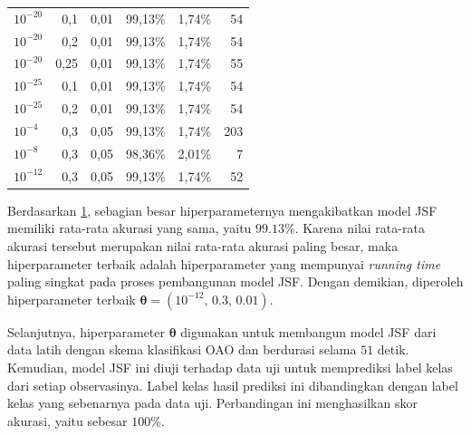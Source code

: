 \begin{table}[h!]
\begin{tabular}{lrrrrr}
    $10^{-20}$ & 0,1   & 0,01  & 99,13\% & 1,74\% & 54 \\
    $10^{-20}$ & 0,2   & 0,01  & 99,13\% & 1,74\% & 54 \\
    $10^{-20}$ & 0,25  & 0,01  & 99,13\% & 1,74\% & 55 \\
    $10^{-25}$ & 0,1   & 0,01  & 99,13\% & 1,74\% & 54 \\
    $10^{-25}$ & 0,2   & 0,01  & 99,13\% & 1,74\% & 54 \\
    $10^{-4}$ & 0,3   & 0,05  & 99,13\% & 1,74\% & 203 \\
    $10^{-8}$ & 0,3   & 0,05  & 98,36\% & 2,01\% & 7 \\
    $10^{-12}$ & 0,3   & 0,05  & 99,13\% & 1,74\% & 52 \\
    \bottomrule
    \end{tabular}%
  \label{tab: iris OAO}%
\end{table}%

\noindent Berdasarkan \ref{tab: iris OAO}, sebagian besar hiperparameternya mengakibatkan model JSF memiliki rata-rata akurasi yang sama, yaitu $\num{99,13}\%$. Karena nilai rata-rata akurasi tersebut merupakan nilai rata-rata akurasi paling besar, maka hiperparameter terbaik adalah hiperparameter yang mempunyai \emph{running time} paling singkat pada proses pembangunan model JSF. Dengan demikian, diperoleh hiperparameter terbaik $\boldsymbol{\theta} = (10^{-12} \text{, } \allowbreak \num{0,3} \text{, } \allowbreak \num{0,01})$.

\noindent Selanjutnya, hiperparameter $\boldsymbol{\theta}$ digunakan untuk membangun model JSF dari data latih dengan skema klasifikasi OAO dan berdurasi selama $51$ detik. Kemudian, model JSF ini diuji terhadap data uji untuk memprediksi label kelas dari setiap observasinya. Label kelas hasil prediksi ini dibandingkan dengan label kelas yang sebenarnya pada data uji. Perbandingan ini menghasilkan skor akurasi, yaitu sebesar $100\%$.

